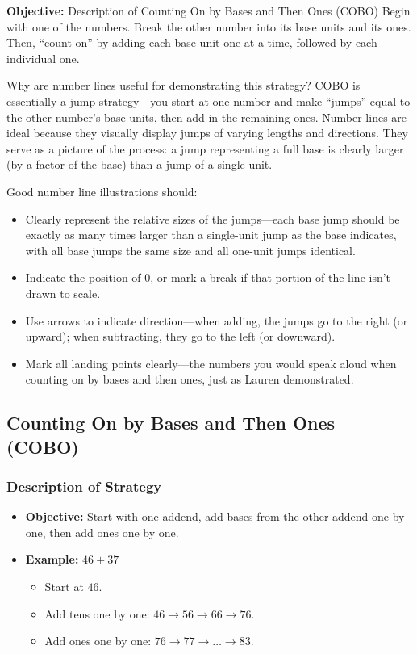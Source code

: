 \documentclass[11pt]{article}
\begin{document}
 \textbf{Objective:} Description of Counting On by Bases and Then Ones (COBO)
 Begin with one of the numbers. Break the other number into its base units and its ones. Then, “count on” by adding each base unit one at a time, followed by each individual one.
 
 Why are number lines useful for demonstrating this strategy?
 COBO is essentially a jump strategy—you start at one number and make “jumps” equal to the other number’s base units, then add in the remaining ones. Number lines are ideal because they visually display jumps of varying lengths and directions. They serve as a picture of the process: a jump representing a full base is clearly larger (by a factor of the base) than a jump of a single unit.
 
 Good number line illustrations should:
\begin{itemize}
 \item Clearly represent the relative sizes of the jumps—each base jump should be exactly as many times larger than a single-unit jump as the base indicates, with all base jumps the same size and all one-unit jumps identical.
 \item Indicate the position of 0, or mark a break if that portion of the line isn’t drawn to scale.
 \item Use arrows to indicate direction—when adding, the jumps go to the right (or upward); when subtracting, they go to the left (or downward).
 \item Mark all landing points clearly—the numbers you would speak aloud when counting on by bases and then ones, just as Lauren demonstrated.
\end{itemize}

\subsection*{Counting On by Bases and Then Ones (COBO)}

\subsubsection*{Description of Strategy}
\begin{itemize}
    \item \textbf{Objective:} Start with one addend, add bases from the other addend one by one, then add ones one by one.
    \item \textbf{Example:} \(46 + 37\)
    \begin{itemize}
        \item Start at \(46\).
        \item Add tens one by one: \(46 \rightarrow 56 \rightarrow 66 \rightarrow 76\).
        \item Add ones one by one: \(76 \rightarrow 77 \rightarrow \ldots \rightarrow 83\).
    \end{itemize}
\end{itemize}
\end{document}
